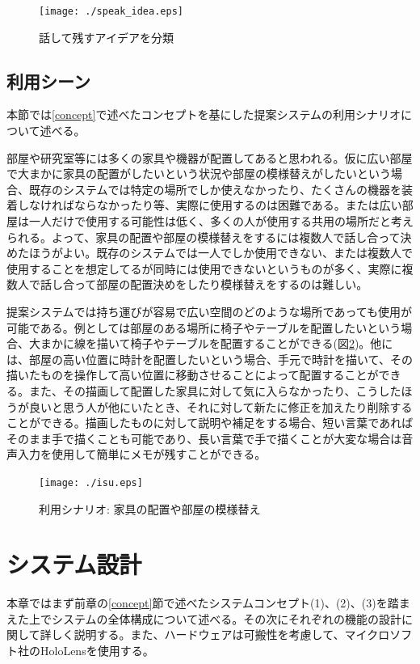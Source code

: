 \documentclass[11pt,a4j, titlepage]{jarticle} %
\begin{document}
\begin{figure}[H]
  \begin{center}
    \texttt{[image: ./speak\_idea.eps]}
    \caption{話して残すアイデアを分類}
    \label{fig:speak_idea}
  \end{center}
\end{figure}

\subsection{利用シーン}
本節では\ref{concept}で述べたコンセプトを基にした提案システムの利用シナリオについて述べる。

部屋や研究室等には多くの家具や機器が配置してあると思われる。仮に広い部屋で大まかに家具の配置がしたいという状況や部屋の模様替えがしたいという場合、既存のシステムでは特定の場所でしか使えなかったり、たくさんの機器を装着しなければならなかったり等、実際に使用するのは困難である。または広い部屋は一人だけで使用する可能性は低く、多くの人が使用する共用の場所だと考えられる。よって、家具の配置や部屋の模様替えをするには複数人で話し合って決めたほうがよい。既存のシステムでは一人でしか使用できない、または複数人で使用することを想定してるが同時には使用できないというものが多く、実際に複数人で話し合って部屋の配置決めをしたり模様替えをするのは難しい。

提案システムでは持ち運びが容易で広い空間のどのような場所であっても使用が可能である。例としては部屋のある場所に椅子やテーブルを配置したいという場合、大まかに線を描いて椅子やテーブルを配置することができる(図\ref{fig:isu})。他には、部屋の高い位置に時計を配置したいという場合、手元で時計を描いて、その描いたものを操作して高い位置に移動させることによって配置することができる。また、その描画して配置した家具に対して気に入らなかったり、こうしたほうが良いと思う人が他にいたとき、それに対して新たに修正を加えたり削除することができる。描画したものに対して説明や補足をする場合、短い言葉であればそのまま手で描くことも可能であり、長い言葉で手で描くことが大変な場合は音声入力を使用して簡単にメモが残すことができる。

\begin{figure}[H]
  \begin{center}
    \texttt{[image: ./isu.eps]}
    \caption{利用シナリオ: 家具の配置や部屋の模様替え}
    \label{fig:isu}
  \end{center}
\end{figure}

\newpage
\section{システム設計}
本章ではまず前章の\ref{concept}節で述べたシステムコンセプト(1)、(2)、(3)を踏まえた上でシステムの全体構成について述べる。その次にそれぞれの機能の設計に関して詳しく説明する。また、ハードウェアは可搬性を考慮して、マイクロソフト社のHoloLens\cite{hololens}を使用する。
\end{document}
